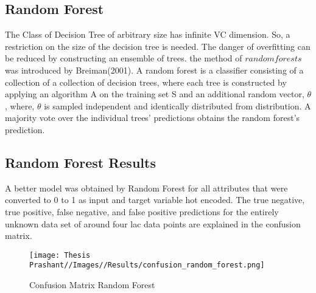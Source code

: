 \subsection{Random Forest}
The Class of Decision Tree of arbitrary size has infinite VC dimension. So, a restriction on the size of the decision tree is needed. The danger of overfitting can be reduced by constructing an ensemble of trees. the method of $random forests$ was introduced by Breiman(2001). A random forest is a classifier consisting of a collection of a collection of decision trees, where each tree is constructed by applying an algorithm A on the training set S and an additional random vector, $\theta$, where, $\theta$ is sampled independent and identically distributed from distribution. A majority vote over the individual trees' predictions obtains the random forest's prediction.

\subsection{Random Forest Results}
A better model was obtained by Random Forest for all attributes that were converted to 0 to 1 as input and target variable hot encoded. The true negative, true positive, false negative, and false positive predictions for the entirely unknown data set of around four lac data points are explained in the confusion matrix.
\begin{figure}
    \centering
    \texttt{[image: Thesis Prashant//Images//Results/confusion\_random\_forest.png]}
    \caption{Confusion Matrix Random Forest}
    \label{fig:enter-label}
\end{figure}